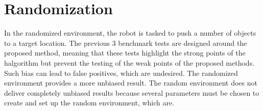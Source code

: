 %
%
%
%

\section{Randomization}%
\label{sec:randomisation}
In the randomized environment, the robot is tasked to push a number of objects to a target location. The previous 3 benchmark tests are designed around the proposed method, meaning that these tests highlight the strong points of the \ac{halgorithm} but prevent the testing of the weak points of the proposed methods. Such bias can lead to false positives, which are undesired. The randomized environment provides a more unbiased result. The random environment does not deliver completely unbiased results because several parameters must be chosen to create and set up the random environment, which are.\\

